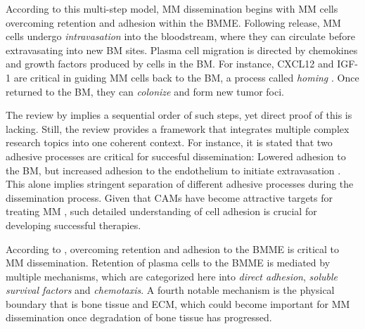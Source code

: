 
According to this multi-step model, \ac{MM} dissemination begins with \ac{MM}
cells overcoming retention and adhesion within the \ac{BMME}. Following release,
\ac{MM} cells undergo \emph{intravasation} into the bloodstream, where they can
circulate before extravasating into new \ac{BM} sites. Plasma cell migration is
directed by chemokines and growth factors produced by cells in the \ac{BM}. For
instance, \ac{CXCL12} and \ac{IGF-1} are critical in guiding \ac{MM} cells back
to the \ac{BM}, a process called \emph{homing}
\cite{vandebroekExtravasationHomingMechanisms2008}. Once returned to the
\ac{BM}, they can \emph{colonize} and form new tumor foci.

The review by \citet{zeissigTumourDisseminationMultiple2020} implies a
sequential order of such steps, yet direct proof of this is lacking. Still, the
review provides a framework that integrates multiple complex research topics
into one coherent context. For instance, it is stated that two adhesive
processes are critical for succesful dissemination: Lowered adhesion to the \ac{BM},
but increased adhesion to the endothelium to initiate extravasation
\cite{asosinghUniquePathwayHoming2001a,
    mrozikTherapeuticTargetingNcadherin2015}. This alone implies stringent
separation of different adhesive processes during the dissemination process.
Given that \acp{CAM} have become attractive targets for
treating \ac{MM} \cite{bouzerdanAdhesionMoleculesMultiple2022,
    katzAdhesionMoleculesLifelines2010}, such detailed understanding of cell
adhesion is crucial for developing successful therapies.


%
\label{sec:intro_myeloma_retention}%
According to \citet{zeissigTumourDisseminationMultiple2020}, overcoming
retention and adhesion to the \ac{BMME} is critical to \ac{MM} dissemination.
Retention of plasma cells to the \ac{BMME} is mediated by multiple mechanisms,
which are categorized here into \emph{direct adhesion}, \emph{soluble survival
    factors} and \emph{chemotaxis}. A fourth notable mechanism is the physical
boundary that is bone tissue and \ac{ECM}, which could become important for
\ac{MM} dissemination once degradation of bone tissue has progressed.

